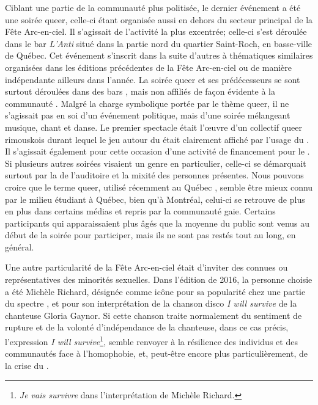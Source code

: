 Ciblant une partie de la communauté plus politisée, le dernier événement a été une soirée queer, celle-ci étant organisée aussi en dehors du secteur principal de la Fête Arc-en-ciel.
Il s'agissait de l'activité la plus excentrée; celle-ci s'est déroulée dans le bar \emph{L'Anti} situé dans la partie nord du quartier Saint-Roch, en basse-ville de Québec.
Cet événement  s'inscrit dans la suite d'autres à thématiques similaires organisées dans les éditions précédentes de la Fête Arc-en-ciel ou de manière indépendante ailleurs dans l'année.
La soirée queer et ses prédécesseurs se sont surtout déroulées dans des bars , mais non affiliés de façon évidente à la communauté \lgbt.
Malgré la charge symbolique portée par le thème queer, il ne s'agissait pas en soi d'un événement politique, mais d'une soirée mélangeant musique, chant et danse.
Le premier spectacle était l'œuvre d'un collectif queer rimouskois durant lequel le jeu autour du  était clairement affiché par l'usage du .
Il s'agissait également pour cette occasion d'une activité de financement pour le \ggul.
Si plusieurs autres soirées visaient un genre en particulier, celle-ci se démarquait surtout par la  de l'auditoire et la mixité des personnes présentes.
Nous pouvons croire que le terme queer, utilisé récemment au Québec \citep[voir][]{Laprade2014}, semble être mieux connu par le milieu étudiant \lgbt{} à Québec, bien qu'à Montréal, celui-ci se retrouve de plus en plus dans certains médias et repris par la communauté gaie.
Certains participants qui apparaissaient plus âgés que la moyenne du public sont venus au début de la soirée pour participer, mais ils ne sont pas restés tout au long, en général.

Une autre particularité de la Fête Arc-en-ciel était d'inviter des  connues ou représentatives des minorités sexuelles.
Dans l'édition de 2016, la personne choisie a été Michèle Richard, désignée comme icône pour sa popularité chez une partie du spectre \lgbt{}, et pour son interprétation de la chanson disco \emph{I will survive} de la chanteuse Gloria Gaynor.
Si cette chanson traite normalement du sentiment de rupture et de la volonté d'indépendance de la chanteuse, dans ce cas précis, l'expression \emph{I will survive}\footnote{\emph{Je vais survivre} dans l'interprétation de Michèle Richard.},
semble renvoyer à la résilience des individus et des communautés \lgbt{} face à l'homophobie, et, peut-être encore plus particulièrement, de la crise du \vih{}.

